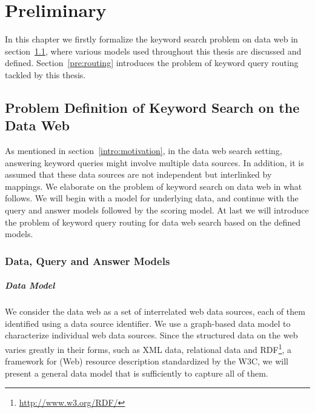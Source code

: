 \chapter{Preliminary}\label{pre}

In this chapter we firstly formalize the keyword search problem on data web in
section~\ref{pre:ksdw}, where various models used throughout this thesis are discussed and defined.
Section~\ref{pre:routing} introduces the problem of keyword query routing tackled by this thesis.

\section{Problem Definition of Keyword Search on the Data Web}\label{pre:ksdw}

As mentioned in section~\ref{intro:motivation}, in the data web search setting, answering keyword
queries might involve multiple data sources. In addition, it is assumed that these data sources are
not independent but interlinked by mappings. We elaborate on the problem of keyword search
on data web in what follows. We will begin with a model for underlying data, and continue with the
query and answer models followed by the scoring model. At last we will introduce the problem of
keyword query routing for data web search based on the defined models.

\subsection{Data, Query and Answer Models}

\paragraph{Data Model}
We consider the data web as a set of interrelated web data sources, each of them identified using a
data source identifier. We use a graph-based data model to characterize individual web data sources.
Since the structured data on the web varies greatly in their forms, such as XML data, relational data
and RDF\footnote{\url{http://www.w3.org/RDF/}}, a framework for (Web) resource description
standardized by the W3C, we will present a general data model that is sufficiently to capture all of
them.

